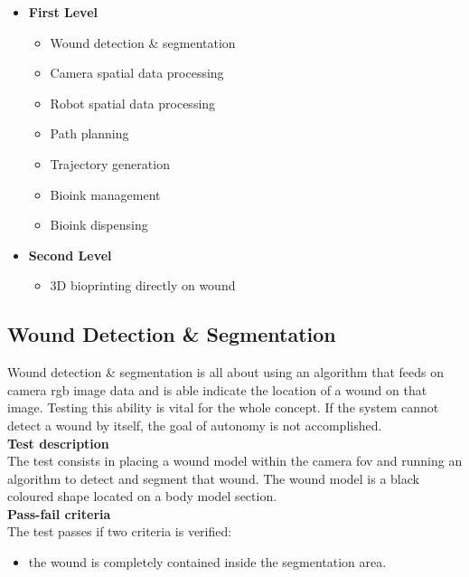 \begin{itemize}
    \item \textbf{First Level}
    \begin{itemize}
        \item Wound detection \& segmentation
        \item Camera spatial data processing
        \item Robot spatial data processing
        \item Path planning
        \item Trajectory generation
        \item Bioink management
        \item Bioink dispensing
    \end{itemize}
    \item \textbf{Second Level}
    \begin{itemize}
        \item 3D bioprinting directly on wound
    \end{itemize}
\end{itemize}

\subsection{Wound Detection \& Segmentation}
\label{subsec:system_validation_tests_setup_wound_detection_segmentation}

Wound detection \& segmentation is all about using an algorithm that feeds on camera \gls{rgb} image data and is able indicate the location of a wound on that image. Testing this ability is vital for the whole concept. If the system cannot detect a wound by itself, the goal of autonomy is not accomplished.\\

\textbf{Test description}\\
The test consists in placing a wound model within the camera \gls{fov} and running an algorithm to detect and segment that wound. The wound model is a black coloured shape located on a body model section.\\

\textbf{Pass-fail criteria}\\
The test passes if two criteria is verified:
\begin{itemize}
    \item the wound is completely contained inside the segmentation area.
\end{itemize}

